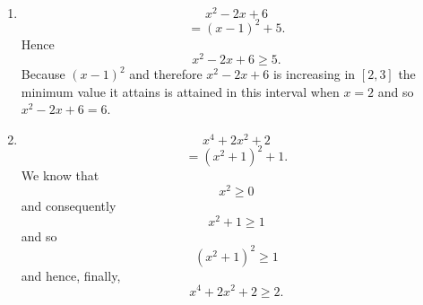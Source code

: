 \begin{enumerate}
\item
\[
x^2 -2x + 6
\]
\[
= (x-1)^2 + 5.
\]
Hence 
\[
x^2-2x+6 \geq 5.
\]
Because $(x-1)^2$ and therefore $x^2 -2x + 6$ is increasing in $[2,3]$ the minimum value it attains is attained in this interval when $x=2$ and so $x^2 -2x+6 = 6$. 
\item
\[
x^4 + 2x^2 + 2
\]
\[
= (x^2 +1)^2 + 1.
\]
We know that 
\[
x^2 \geq 0
\]
and consequently
\[
x^2 + 1 \geq 1
\]
and so
\[
(x^2 + 1)^2 \geq 1
\]
and hence, finally,
\[
x^4 + 2x^2 + 2 \geq 2.
\]
\end{enumerate}